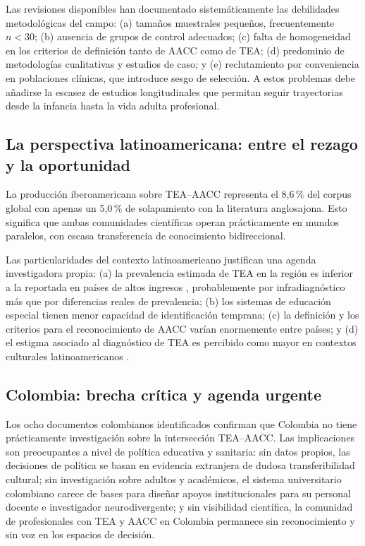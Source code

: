 \documentclass[12pt, a4paper]{article}
\begin{document}
Las revisiones disponibles \parencite{gelbar2022, luor2021} han documentado
sistemáticamente las debilidades metodológicas del campo: (a) tamaños muestrales
pequeños, frecuentemente $n < 30$; (b) ausencia de grupos de control adecuados;
(c) falta de homogeneidad en los criterios de definición tanto de AACC como de TEA;
(d) predominio de metodologías cualitativas y estudios de caso; y (e) reclutamiento
por conveniencia en poblaciones clínicas, que introduce sesgo de selección. A estos
problemas debe añadirse la escasez de estudios longitudinales que permitan seguir
trayectorias desde la infancia hasta la vida adulta profesional.

\subsection{La perspectiva latinoamericana: entre el rezago y la oportunidad}

La producción iberoamericana sobre TEA--AACC representa el 8,6\,\% del corpus
global con apenas un 5,0\,\% de solapamiento con la literatura anglosajona.
Esto significa que ambas comunidades científicas operan prácticamente en mundos
paralelos, con escasa transferencia de conocimiento bidireccional.

Las particularidades del contexto latinoamericano justifican una agenda investigadora
propia: (a) la prevalencia estimada de TEA en la región es inferior a la reportada
en países de altos ingresos \parencite{salari2022}, probablemente por infradiagnóstico
más que por diferencias reales de prevalencia; (b) los sistemas de educación
especial tienen menor capacidad de identificación temprana; (c) la definición
y los criterios para el reconocimiento de AACC varían enormemente entre países; y
(d) el estigma asociado al diagnóstico de TEA es percibido como mayor en contextos
culturales latinoamericanos \parencite{conejeros2018}.

\subsection{Colombia: brecha crítica y agenda urgente}

Los ocho documentos colombianos identificados confirman que Colombia no tiene
prácticamente investigación sobre la intersección TEA--AACC. Las implicaciones
son preocupantes a nivel de política educativa y sanitaria: sin datos propios,
las decisiones de política se basan en evidencia extranjera de dudosa transferibilidad
cultural; sin investigación sobre adultos y académicos, el sistema universitario
colombiano carece de bases para diseñar apoyos institucionales para su personal
docente e investigador neurodivergente; y sin visibilidad científica, la comunidad
de profesionales con TEA y AACC en Colombia permanece sin reconocimiento y sin voz
en los espacios de decisión.
\end{document}
